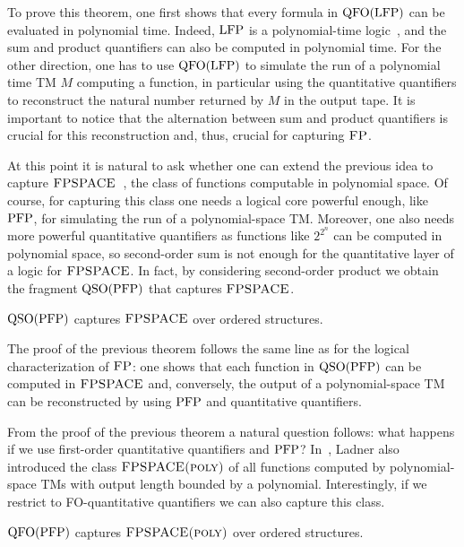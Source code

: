 To prove this theorem, 
one first shows that every formula in ${\rm QFO}({\rm LFP})$ can be evaluated in polynomial time. 
Indeed, ${\rm LFP}$ is a polynomial-time logic~\cite{I86,vardi1982complexity}, and the sum and product quantifiers can also be computed in polynomial time. 
For the other direction, one has to use ${\rm QFO}({\rm LFP})$ to simulate the run of a polynomial time TM $M$ computing a function, in particular using the quantitative quantifiers to reconstruct the natural number returned by $M$ in the output tape. 
It is important to notice that the alternation between sum and product quantifiers is crucial for this reconstruction and, thus, crucial for capturing $\text{\sc FP}$.

At this point it is natural to ask whether one can extend the previous idea to capture $\text{\sc FPSPACE}$~\cite{Ladner89}, the class of functions computable in polynomial space. 
Of course, for capturing this class one needs a logical core powerful enough, like ${\rm PFP}$, for simulating the run of a polynomial-space TM.
Moreover, 
one also needs more powerful quantitative quantifiers as functions like $2^{2^n}$ can be computed in polynomial space,
so second-order sum is not enough for the quantitative layer of a logic for $\text{\sc FPSPACE}$.
In fact, by considering second-order product we obtain the fragment ${\rm QSO}({\rm PFP})$ that 
captures $\text{\sc FPSPACE}$. 
\begin{theorem} \label{theo:capture-fpspace}
	${\rm QSO}({\rm PFP})$ captures $\text{\sc FPSPACE}$ over ordered structures.
\end{theorem}
The proof of the previous theorem follows the same line as for the logical characterization of $\text{\sc FP}$: one shows that each function in ${\rm QSO}({\rm PFP})$ can be computed in $\text{\sc FPSPACE}$ and, conversely, the output of a polynomial-space TM can be reconstructed by using ${\rm PFP}$ and quantitative quantifiers.

From the proof of the previous theorem a natural question follows: what happens if we use first-order quantitative quantifiers and ${\rm PFP}$?
In~\cite{Ladner89}, Ladner also introduced the class $\text{\sc FPSPACE(poly)}$ of all functions computed by polynomial-space TMs 
with output length bounded by a polynomial.
Interestingly, if we restrict to FO-quantitative quantifiers we can also capture this class.
\begin{corollary} \label{cor:capture-fpspace-poly}
	${\rm QFO}({\rm PFP})$ captures $\text{\sc FPSPACE(poly)}$ over ordered structures.
\end{corollary}

